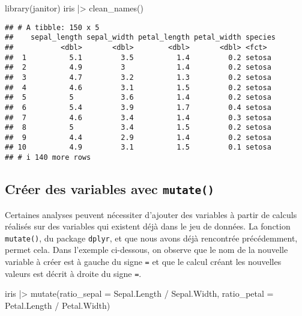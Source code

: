 \documentclass[
]{book}
\newenvironment{Shaded}{\begin{snugshade}}{\end{snugshade}}
\newcommand{\AttributeTok}[1]{\textcolor[rgb]{0.77,0.63,0.00}{#1}}
\newcommand{\FunctionTok}[1]{\textcolor[rgb]{0.00,0.00,0.00}{#1}}
\newcommand{\NormalTok}[1]{#1}
\newcommand{\SpecialCharTok}[1]{\textcolor[rgb]{0.00,0.00,0.00}{#1}}
\begin{document}
\begin{Shaded}
\begin{Highlighting}[]
\FunctionTok{library}\NormalTok{(janitor)}
\NormalTok{iris }\SpecialCharTok{|\textgreater{}}
  \FunctionTok{clean\_names}\NormalTok{()}
\end{Highlighting}
\end{Shaded}

\begin{verbatim}
## # A tibble: 150 x 5
##    sepal_length sepal_width petal_length petal_width species
##           <dbl>       <dbl>        <dbl>       <dbl> <fct>  
##  1          5.1         3.5          1.4         0.2 setosa 
##  2          4.9         3            1.4         0.2 setosa 
##  3          4.7         3.2          1.3         0.2 setosa 
##  4          4.6         3.1          1.5         0.2 setosa 
##  5          5           3.6          1.4         0.2 setosa 
##  6          5.4         3.9          1.7         0.4 setosa 
##  7          4.6         3.4          1.4         0.3 setosa 
##  8          5           3.4          1.5         0.2 setosa 
##  9          4.4         2.9          1.4         0.2 setosa 
## 10          4.9         3.1          1.5         0.1 setosa 
## # i 140 more rows
\end{verbatim}

\hypertarget{cruxe9er-des-variables-avec-mutate}{%
\subsection{\texorpdfstring{Créer des variables avec \texttt{mutate()}}{Créer des variables avec mutate()}}\label{cruxe9er-des-variables-avec-mutate}}

Certaines analyses peuvent nécessiter d'ajouter des variables à partir de calculs réalisés sur des variables qui existent déjà dans le jeu de données. La fonction \texttt{mutate()}, du package \texttt{dplyr}, et que nous avons déjà rencontrée précédemment, permet cela. Dans l'exemple ci-dessous, on observe que le nom de la nouvelle variable à créer est à gauche du signe \texttt{=} et que le calcul créant les nouvelles valeurs est décrit à droite du signe \texttt{=}.

\begin{Shaded}
\begin{Highlighting}[]
\NormalTok{iris }\SpecialCharTok{|\textgreater{}}
  \FunctionTok{mutate}\NormalTok{(}\AttributeTok{ratio\_sepal =}\NormalTok{ Sepal.Length }\SpecialCharTok{/}\NormalTok{ Sepal.Width,}
         \AttributeTok{ratio\_petal =}\NormalTok{ Petal.Length }\SpecialCharTok{/}\NormalTok{ Petal.Width)}
\end{Highlighting}
\end{Shaded}
\end{document}
